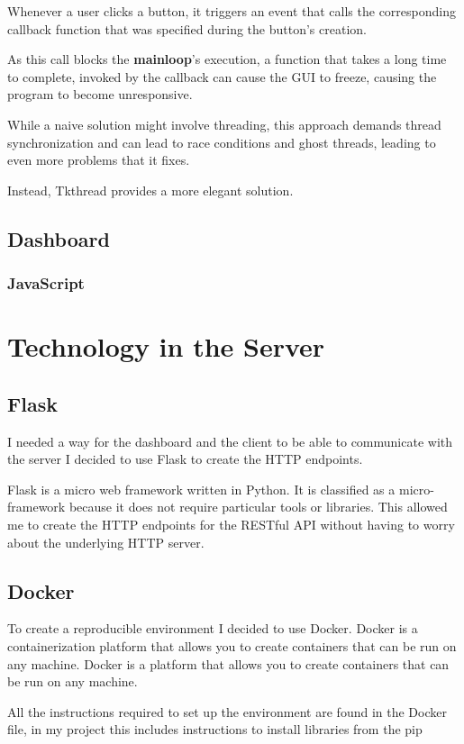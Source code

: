 Whenever a user clicks a button,
it triggers an event that calls the corresponding callback function
that was specified during the button's creation.

As this call blocks the \textbf{mainloop}'s execution,
a function that takes a long time to complete,
invoked by the callback can cause the GUI to freeze,
causing the program to become unresponsive.

While a naive solution might involve threading,
this approach demands thread synchronization and can lead to race conditions
and ghost threads, leading to even more problems that it fixes.

Instead, Tkthread provides a more elegant solution.

\subsection{Dashboard}


\subsubsection{JavaScript}

\section{Technology in the Server}
\subsection{Flask}
I needed a way for the dashboard and the client to be able to communicate with the server
I decided to use Flask to create the HTTP endpoints.

Flask is a micro web framework written in Python.
It is classified as a micro-framework because it does not require particular tools or libraries.
This allowed me to create the HTTP endpoints for the RESTful API without having to worry about the underlying HTTP server.

\subsection{Docker}
To create a reproducible environment I decided to use Docker.
Docker is a containerization platform that allows you to create containers that can be run on any machine.
Docker is a platform that allows you to create containers that can be run on any machine.

All the instructions required to set up the environment are found in the Docker file, in my project this includes instructions to install libraries from the pip

